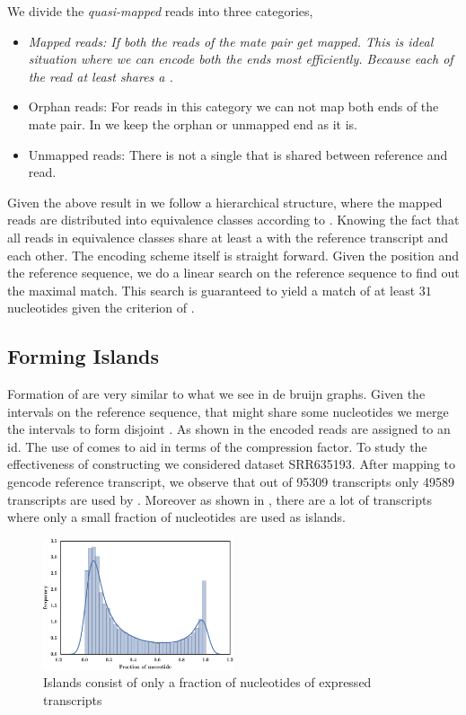 We divide the \textit{quasi-mapped} reads into three categories, 
\begin{itemize}
    \item \it{Mapped reads:} If both the reads of the mate pair get mapped. This is ideal situation where we can encode both the ends most efficiently. Because each of the read at least shares a \kmer.
    \item {Orphan reads:} For reads in this category we can not map both ends of the mate pair. In \quark we keep the orphan or unmapped end as it is.
    \item {Unmapped reads:} There is not a single \kmer that is shared between reference  and read.
\end{itemize}

Given the above result in \quark we follow a hierarchical structure, where the mapped reads are distributed into equivalence classes according to . Knowing the fact that all reads in equivalence classes share at least a \kmer with the reference transcript and each other. The encoding scheme itself is straight forward. Given the position and the reference sequence, we do a linear search on the reference sequence to find out the maximal match. This search is guaranteed to yield a match of at least $31$ nucleotides given the criterion of \qm.

\subsection{Forming Islands}

Formation of \iss are very similar to what we see in de bruijn graphs. Given the intervals on the reference sequence, that might share some nucleotides we merge the intervals to form disjoint \iss. As shown in  the encoded reads are assigned to an \is id. The use of \is comes to aid in terms of the compression factor. To study the effectiveness of constructing \iss we considered dataset SRR635193. After mapping to gencode reference transcript, we observe that out of 95309 transcripts only 49589 transcripts are used by \quark. Moreover as shown in , there are a lot of transcripts where only a small fraction of nucleotides are used as islands.  

\begin{figure}[!ht]
\includegraphics[width=0.5\textwidth]{Figures/ratio}
\centering
\caption{\label{fig:ratio}Islands consist of only a fraction of nucleotides of expressed transcripts}
\end{figure}

